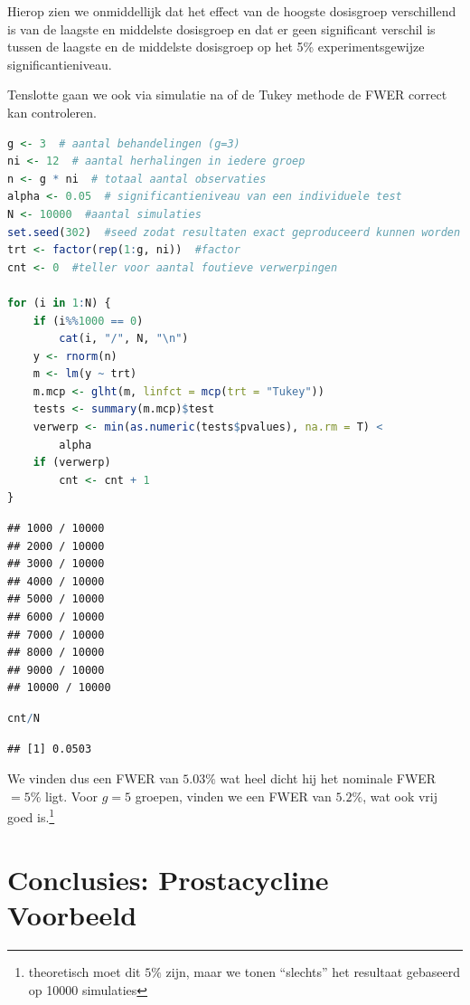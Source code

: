 \documentclass[
  12pt,dutch,coursenotes]{book}
\begin{document}
Hierop zien we onmiddellijk dat het effect van de hoogste dosisgroep verschillend is van de laagste en middelste dosisgroep en dat er geen significant verschil is tussen de laagste en de middelste dosisgroep op het 5\% experimentsgewijze significantieniveau.

Tenslotte gaan we ook via simulatie na of de Tukey methode de FWER correct kan controleren.

\begin{lstlisting}[language=R]
g <- 3  # aantal behandelingen (g=3)
ni <- 12  # aantal herhalingen in iedere groep
n <- g * ni  # totaal aantal observaties
alpha <- 0.05  # significantieniveau van een individuele test
N <- 10000  #aantal simulaties
set.seed(302)  #seed zodat resultaten exact geproduceerd kunnen worden
trt <- factor(rep(1:g, ni))  #factor
cnt <- 0  #teller voor aantal foutieve verwerpingen

for (i in 1:N) {
    if (i%%1000 == 0)
        cat(i, "/", N, "\n")
    y <- rnorm(n)
    m <- lm(y ~ trt)
    m.mcp <- glht(m, linfct = mcp(trt = "Tukey"))
    tests <- summary(m.mcp)$test
    verwerp <- min(as.numeric(tests$pvalues), na.rm = T) <
        alpha
    if (verwerp)
        cnt <- cnt + 1
}
\end{lstlisting}

\begin{lstlisting}
## 1000 / 10000 
## 2000 / 10000 
## 3000 / 10000 
## 4000 / 10000 
## 5000 / 10000 
## 6000 / 10000 
## 7000 / 10000 
## 8000 / 10000 
## 9000 / 10000 
## 10000 / 10000
\end{lstlisting}

\begin{lstlisting}[language=R]
cnt/N
\end{lstlisting}

\begin{lstlisting}
## [1] 0.0503
\end{lstlisting}

We vinden dus een FWER van \(5.03\%\) wat heel dicht hij het nominale FWER\(=5\%\) ligt.
Voor \(g=5\) groepen, vinden we een FWER van \(5.2\%\), wat ook vrij goed is.\footnote{theoretisch moet dit \(5\%\) zijn, maar we tonen ``slechts'' het resultaat gebaseerd op 10000 simulaties}

\hypertarget{conclusies-prostacycline-voorbeeld}{%
\section{Conclusies: Prostacycline Voorbeeld}\label{conclusies-prostacycline-voorbeeld}}
\end{document}
